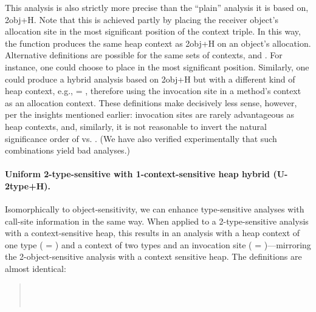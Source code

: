 This analysis is also strictly more precise than the ``plain''
analysis it is based on, 2obj+H. Note that this is achieved partly by
placing the receiver object's allocation site in the most significant
position of the context triple. In this way, the 
function produces the same heap context as 2obj+H on an object's
allocation. Alternative definitions are possible for the same sets of
contexts,  and . For instance, one could choose to
place  in the most significant position. Similarly, one
could produce a hybrid analysis based on 2obj+H but with a different
kind of heap context, e.g.,  = , therefore using the
invocation site in a method's context as an allocation context.  These
definitions make decisively less sense, however, per the insights
mentioned earlier: invocation sites are rarely advantageous as heap
contexts, and, similarly, it is not reasonable to invert the natural
significance order of  vs. . (We have also
verified experimentally that such combinations yield bad analyses.)


\paragraph{Uniform 2-type-sensitive with 1-context-sensitive heap hybrid (U-2type+H).}

Isomorphically to object-sensitivity, we can enhance type-sensitive
analyses with call-site information in the same way. When applied to a
2-type-sensitive analysis with a context-sensitive heap, this results
in an analysis with a heap context of one type ( = )
and a context of two types and an invocation site ( = )---mirroring the 2-object-sensitive analysis
with a context sensitive heap. The definitions are almost identical:
\begin{quote}
 \\
 \\
\end{quote}


